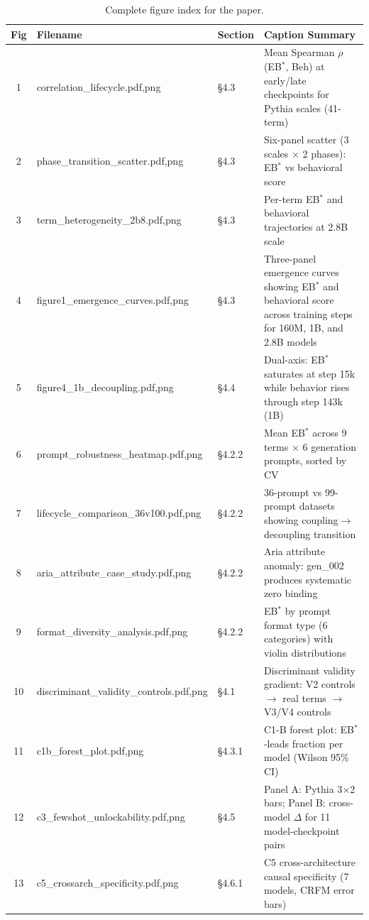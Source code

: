 \documentclass[10pt]{article} %
\begin{document}
\begin{table}[H]
\centering
\scriptsize
\begin{tabular}{|c|l|l|p{6cm}|}
\hline
\textbf{Fig} & \textbf{Filename} & \textbf{Section} & \textbf{Caption Summary} \\
\hline
1 & correlation\_lifecycle.{pdf,png} & \S4.3 & Mean Spearman $\rho$(EB$^*$, Beh) at early/late checkpoints for Pythia scales (41-term) \\
2 & phase\_transition\_scatter.{pdf,png} & \S4.3 & Six-panel scatter (3 scales $\times$ 2 phases): EB$^*$ vs behavioral score \\
3 & term\_heterogeneity\_2b8.{pdf,png} & \S4.3 & Per-term EB$^*$ and behavioral trajectories at 2.8B scale \\
4 & figure1\_emergence\_curves.{pdf,png} & \S4.3 & Three-panel emergence curves showing EB$^*$ and behavioral score across training steps for 160M, 1B, and 2.8B models \\
5 & figure4\_1b\_decoupling.{pdf,png} & \S4.4 & Dual-axis: EB$^*$ saturates at step 15k while behavior rises through step 143k (1B) \\
6 & prompt\_robustness\_heatmap.{pdf,png} & \S4.2.2 & Mean EB$^*$ across 9 terms $\times$ 6 generation prompts, sorted by CV \\
7 & lifecycle\_comparison\_36v100.{pdf,png} & \S4.2.2 & 36-prompt vs 99-prompt datasets showing coupling$\to$decoupling transition \\
8 & aria\_attribute\_case\_study.{pdf,png} & \S4.2.2 & Aria attribute anomaly: gen\_002 produces systematic zero binding \\
9 & format\_diversity\_analysis.{pdf,png} & \S4.2.2 & EB$^*$ by prompt format type (6 categories) with violin distributions \\
10 & discriminant\_validity\_controls.{pdf,png} & \S4.1 & Discriminant validity gradient: V2 controls $\to$ real terms $\to$ V3/V4 controls \\
11 & c1b\_forest\_plot.{pdf,png} & \S4.3.1 & C1-B forest plot: EB$^*$-leads fraction per model (Wilson 95\% CI) \\
12 & c3\_fewshot\_unlockability.{pdf,png} & \S4.5 & Panel A: Pythia 3$\times$2 bars; Panel B: cross-model $\Delta$ for 11 model-checkpoint pairs \\
13 & c5\_crossarch\_specificity.{pdf,png} & \S4.6.1 & C5 cross-architecture causal specificity (7 models, CRFM error bars) \\
\hline
\end{tabular}
\caption{Complete figure index for the paper.}
\end{table}
\end{document}
